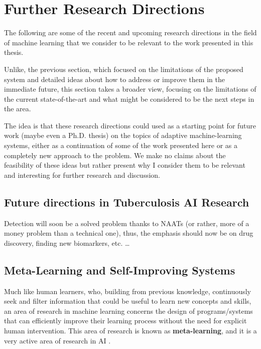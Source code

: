\documentclass[../main.tex]{subfiles}
\begin{document}
    \clearpage

    \section{Further Research Directions} \label{conclusions:research_directions} 

    The following are some of the recent and upcoming research directions in the field of machine learning that we consider to be relevant to the work presented in this thesis.
    
    Unlike, the previous section, which focused on the limitations of the proposed system and detailed ideas about how to address or improve them in the immediate future, this section takes a broader view, focusing on the limitations of the current state-of-the-art and what might be considered to be the next steps in the area.
    
    The idea is that these research directions could used as a starting point for future work (maybe even a Ph.D. thesis) on the topics of adaptive machine-learning systems, either as a continuation of some of the work presented here or as a completely new approach to the problem. We make no claims about the feasibility of these ideas but rather present why I consider them to be relevant and interesting for further research and discussion.


    \subsection{Future directions in Tuberculosis AI Research} \label{conclusions:future_work:tb_ai} 
    
    Detection will soon be a solved problem thanks to NAATs (or rather, more of a money problem than a technical one), thus, the emphasis should now be on drug discovery, finding new biomarkers, etc. \dots

    \clearpage

    \subsection{Meta-Learning and Self-Improving Systems} \label{conclusions:research_directions:l2l} 

    Much like human learners, who, building from previous knowledge, continuously seek and filter information that could be useful to learn new concepts and skills, an area of research in machine learning concerns the design of programs/systems that can efficiently improve their learning process without the need for explicit human intervention. This area of research is known as \textbf{meta-learning}, and it is a very active area of research in AI .
    
\end{document}
